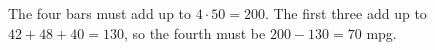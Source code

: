 The four bars must add up to $4\cdot50=200$. The first three add up to $42+48+40=130$, so the fourth must be $200-130=\boxed{70}$ mpg.
